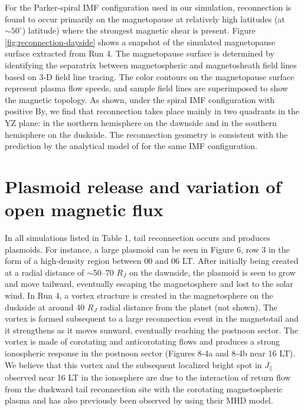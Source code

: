 For the Parker‐spiral IMF configuration used in our simulation, reconnection is found to occur primarily on the magnetopause at relatively high latitudes (at $\sim50^\circ$) latitude) where the strongest magnetic shear is present. Figure \ref{fig:reconnection-dayside} shows a snapshot of the simulated magnetopause surface extracted from Run 4. The magnetopause surface is determined by identifying the separatrix between magnetospheric and magnetosheath field lines based on 3‐D field line tracing. The color contours on the magnetopause surface represent plasma flow speeds, and sample field lines are superimposed to show the magnetic topology. As shown, under the spiral IMF configuration with positive By, we find that reconnection takes place mainly in two quadrants in the YZ plane: in the northern hemisphere on the dawnside and in the southern hemisphere on the duskside. The reconnection geometry is consistent with the prediction by the analytical model of \cite{Masters2017} for the same IMF configuration.

\section{Plasmoid release and variation of open magnetic flux}

In all simulations listed in Table 1, tail reconnection occurs and produces plasmoids. For instance, a large plasmoid can be seen in Figure 6, row 3 in the form of a high‐density region between 00 and 06 LT. After initially being created at a radial distance of $\sim$50–70 $R_J$ on the dawnside, the plasmoid is seen to grow and move tailward, eventually escaping the magnetosphere and lost to the solar wind. In Run 4, a vortex structure is created in the magnetosphere on the duskside at around 40 $R_J$ radial distance from the planet (not shown). The vortex is formed subsequent to a large reconnection event in the magnetotail and it strengthens as it moves sunward, eventually reaching the postnoon sector. The vortex is made of corotating and anticorotating flows and produces a strong ionospheric response in the postnoon sector (Figures 8‐4a and 8‐4b near 16 LT). We believe that this vortex and the subsequent localized bright spot in $J_\parallel$ observed near 16 LT in the ionosphere are due to the interaction of return flow from the duskward tail reconnection site with the corotating magnetospheric plasma and has also previously been observed by \cite{Fukazawa2006a} using their MHD model. 

